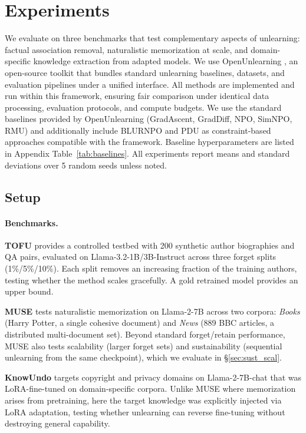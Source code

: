 \section{Experiments}
\label{sec:results}
We evaluate \method on three benchmarks that test complementary aspects of unlearning: factual association removal, naturalistic memorization at scale, and domain-specific knowledge extraction from adapted models.
We use OpenUnlearning \citep{shi2025muse}, an open-source toolkit that bundles standard unlearning baselines, datasets, and evaluation pipelines under a unified interface.
All methods are implemented and run within this framework, ensuring fair comparison under identical data processing, evaluation protocols, and compute budgets.
We use the standard baselines provided by OpenUnlearning (GradAscent, GradDiff, NPO, SimNPO, RMU) and additionally include BLURNPO \citep{reisizadeh2026blur} and PDU \citep{entesari2026constrained} as constraint-based approaches compatible with the framework.
Baseline hyperparameters are listed in Appendix Table~\ref{tab:baselines}.
All experiments report means and standard deviations over 5 random seeds unless noted.

\subsection{Setup}

\paragraph{Benchmarks.}
\textbf{TOFU} \citep{maini2024tofu} provides a controlled testbed with 200 synthetic author biographies and QA pairs, evaluated on Llama-3.2-1B/3B-Instruct across three forget splits (1\%/5\%/10\%). Each split removes an increasing fraction of the training authors, testing whether the method scales gracefully. A gold retrained model provides an upper bound.

\textbf{MUSE} \citep{shi2025muse} tests naturalistic memorization on Llama-2-7B across two corpora: \emph{Books} (Harry Potter, a single cohesive document) and \emph{News} (889 BBC articles, a distributed multi-document set). Beyond standard forget/retain performance, MUSE also tests scalability (larger forget sets) and sustainability (sequential unlearning from the same checkpoint), which we evaluate in \S\ref{sec:sust_scal}.

\textbf{KnowUndo} \citep{tian2024knowundo} targets copyright and privacy domains on Llama-2-7B-chat that was LoRA-fine-tuned on domain-specific corpora. Unlike MUSE where memorization arises from pretraining, here the target knowledge was explicitly injected via LoRA adaptation, testing whether unlearning can reverse fine-tuning without destroying general capability.

